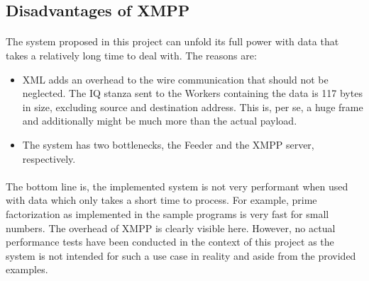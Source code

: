 \subsection{Disadvantages of XMPP}
\paragraph{}
The system proposed in this project can unfold its full power with data that takes a relatively long time to deal with. The reasons are:
\begin{itemize}
\item XML adds an overhead to the wire communication that should not be neglected. The IQ stanza sent to the Workers containing the data is 117 bytes in size, excluding source and destination address. This is, per se, a huge frame and additionally might be much more than the actual payload.
\item The system has two bottlenecks, the Feeder and the XMPP server, respectively.
\end{itemize}

\paragraph{}
The bottom line is, the implemented system is not very performant when used with data which only takes a short time to process. For example, prime factorization as implemented in the sample programs is very fast for small numbers. The overhead of XMPP is clearly visible here. However, no actual performance tests have been conducted in the context of this project as the system is not intended for such a use case in reality and aside from the provided examples.
